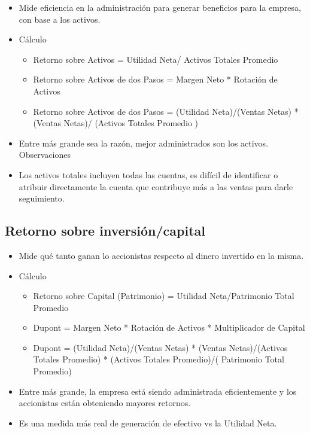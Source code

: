 \begin{itemize}
    \item Mide  eficiencia  en  la  administración  para  generar  beneficios  para  la  empresa,  con  base  a  los 
    activos. 
    \item Cálculo 
    \begin{itemize}
        \item Retorno sobre Activos = Utilidad Neta/ Activos Totales Promedio
        \item Retorno sobre Activos de dos Pasos =  Margen Neto  *      Rotación de Activos 
        \item Retorno sobre Activos de dos Pasos =  (Utilidad Neta)/(Ventas Netas)  * 
       (Ventas Netas)/ (Activos Totales Promedio )
    \end{itemize}

    \item Entre más grande sea la razón, mejor administrados son los activos. 
    Observaciones 
    \item Los activos totales incluyen todas las cuentas, es difícil de identificar o atribuir directamente la 
    cuenta que contribuye más a las ventas para darle seguimiento.
\end{itemize}

\subsection{Retorno sobre inversión/capital}

\begin{itemize}
    \item Mide qué tanto ganan lo accionistas respecto al dinero invertido en la misma. 
    \item Cálculo
    \begin{itemize}
        \item Retorno sobre Capital (Patrimonio) = Utilidad Neta/Patrimonio Total Promedio 
        \item Dupont =  Margen Neto  * Rotación de Activos * Multiplicador de Capital 
        \item Dupont =  (Utilidad Neta)/(Ventas Netas) * (Ventas Netas)/(Activos Totales Promedio) * (Activos Totales Promedio)/(      Patrimonio Total Promedio) 
    \end{itemize}
    \item Entre más grande, la empresa está siendo administrada eficientemente y los accionistas están obteniendo mayores retornos. 
 
\item Es una medida más real de generación de efectivo vs la Utilidad Neta.
\end{itemize}


